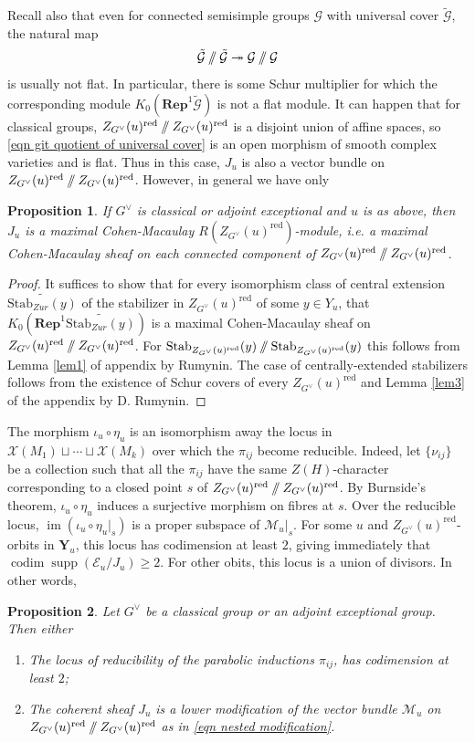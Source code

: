 \documentclass[10pt]{article}
\DeclareMathOperator{\codim}{codim}
\def\onto{\mathrel{\twoheadrightarrow}}
\DeclareMathOperator{\im}{\mathrm{im}}
\newcommand{\stab}[2]{\mathrm{Stab}_{#1}(#2)}
\newcommand{\Rep}{\mathbf{Rep}}
\newcommand{\git}{\mathbin{
  \mathchoice{/\mkern-6mu/}%
    {/\mkern-6mu/}%
    {/\mkern-5mu/}%
    {/\mkern-5mu/}}}%
\newcommand{\X}{\mathcal{X}}
\newcommand{\Gg}{\mathcal{G}}
\newcommand{\Ee}{\mathcal{E}}
\DeclareMathOperator{\supp}{supp}
\newtheorem{prop}{Proposition}
\theoremstyle{definition}
\theoremstyle{remark}
\newcommand{\Zur}{Z_{G^\vee}(u)^{\mathrm{red}}}
\newcommand{\Y}{\mathbf{Y}}
\newcommand{\mMu}{\mathcal{M}_u}
\begin{document}
Recall also that even for connected semisimple groups $\Gg$ with universal cover $\tilde{\Gg}$, the natural map 
%
\begin{equation}
\label{eqn git quotient of universal cover}
\tilde{\Gg}\git\tilde{\Gg}\onto\Gg\git\Gg
\end{equation}
%
is usually not flat. In particular, there is some Schur multiplier for which the corresponding module $K_0(\Rep^1\tilde{\Gg})$ is not a flat module.
It can happen that for classical groups, $\Zur\git\Zur$ is a disjoint union of affine spaces, so \eqref{eqn git quotient of universal cover} is an open morphism of smooth complex varieties and is flat. Thus in this case, $J_u$ is also a vector bundle on $\Zur\git\Zur$. However, in general we have only
%
\begin{prop}
\label{Ju is a vector bundle}
If  $G^\vee$ is classical or adjoint exceptional and $u$ is as above, then $J_u$ is a maximal Cohen-Macaulay $R(\Zur)$-module, \textit{i.e.} a maximal Cohen-Macaulay sheaf on each connected component of $\Zur\git\Zur$.
\end{prop}
%
\begin{proof}
It suffices to show that for every isomorphism class of central extension $\widetilde{\stab{Zur}{y}}$ of the stabilizer in $\Zur$ of some $y\in Y_u$, that $K_0(\Rep^1\widetilde{\stab{Zur}{y}})$ is a maximal Cohen-Macaulay 
sheaf on $\Zur\git\Zur$. For $\stab{\Zur}{y}\git\stab{\Zur}{y}$ this follows from Lemma \ref{lem1} of appendix by Rumynin. The case of centrally-extended stabilizers follows from the existence of Schur covers of every $\Zur$ \cite{Propp} and Lemma \ref{lem3} of the appendix by D. Rumynin.
\end{proof}
%
The morphism
$\iota_u\circ\eta_u$ is an isomorphism away the locus in $\X(M_1)\sqcup\cdots\sqcup\X(M_k)$ over which the $\pi_{ij}$ become reducible. Indeed,
let $\{\nu_{ij}\}$ be a collection such that all the  $\pi_{ij}$ have the same 
$Z(H)$-character corresponding to a closed point $s$ of $\Zur\git\Zur$. 
By Burnside's theorem, $\iota_u\circ\eta_u$ induces a surjective morphism on 
fibres at $s$. Over the reducible locus, $\im(\iota_u\circ\eta_u|_s)$ is a proper subspace of $\mMu|_{s}$.
For some $u$ and $\Zur$-orbits in $\Y_u$, this locus has codimension at least $2$, giving immediately that $\codim\supp(\Ee_u/J_u)\geq 2$. For other obits, this locus is a union of divisors. In other words,
%
\begin{prop}
\label{prop Ju saturated lower modification}
Let $G^\vee$ be a classical group or an adjoint exceptional group. 
Then either
%
\begin{enumerate}
\item[(a)] 
The locus of reducibility of the parabolic inductions $\pi_{ij}$, has codimension at least $2$;
%
\item[(b)]
The coherent sheaf $J_u$ is a lower modification 
of the vector bundle $\mMu$ on $\Zur\git\Zur$ as in \eqref{eqn nested modification}.
\end{enumerate}
\end{prop}
\end{document}
